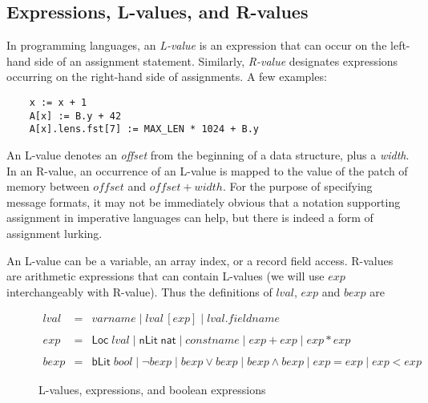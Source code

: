 \documentclass[svgnames]{llncs}
\newcommand{\konst}[1]{\ensuremath{\mathsf{#1}}}
\begin{document}
\subsection{Expressions, L-values, and R-values}

In programming languages, an \emph{L-value} is an expression that can
occur on the left-hand side of an assignment statement. Similarly,
\emph{R-value} designates expressions occurring on the right-hand side
of assignments. A few examples:

\begin{verbatim}
    x := x + 1
    A[x] := B.y + 42
    A[x].lens.fst[7] := MAX_LEN * 1024 + B.y
\end{verbatim}

An L-value denotes an \emph{offset} from the beginning of a
data structure, plus a \emph{width}. In an R-value, an occurrence of an
L-value is mapped to the value of the patch of memory between
$\mathit{offset}$ and $\mathit{offset} + \mathit{width}$. For the
purpose of specifying message formats, it may not be immediately
obvious that a notation supporting assignment in imperative languages
can help, but there is indeed a form of assignment lurking.

An L-value can be a variable, an array index, or a record field
access. R-values are arithmetic expressions that can contain L-values
(we will use $\mathit{exp}$ interchangeably with R-value). Thus the
definitions of $\mathit{lval}$, $\mathit{exp}$ and $\mathit{bexp}$ are

\begin{figure}
\[
\begin{array}{rcl}
\mathit{lval} & = & \mathit{varname} \mid
                    \mathit{lval} \, [ \mathit{exp} ] \mid
                    \mathit{lval} . \mathit{fieldname} \\
  & & \\
\mathit{exp} & = & \konst{Loc}\; \mathit{lval}
              \mid \konst{nLit}\; \konst{nat}
              \mid \mathit{constname}
              \mid \mathit{exp} + \mathit{exp}
              \mid \mathit{exp} * \mathit{exp} \\
  & & \\
\mathit{bexp} & = & \konst{bLit}\; bool
              \mid  \neg \mathit{bexp}
              \mid  \mathit{bexp} \lor \mathit{bexp}
              \mid  \mathit{bexp} \land \mathit{bexp}
              \mid  \mathit{exp} = \mathit{exp}
              \mid  \mathit{exp} < \mathit{exp}
\end{array}
\]
\caption{L-values, expressions, and boolean expressions}
\end{figure}
\end{document}
